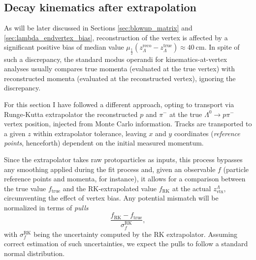 \subsection{Decay kinematics after extrapolation}
\label{sec:3:true_vtx_kinematics}
As will be later discussed in Sections \ref{sec:blowup_matrix} and \ref{sec:lambda_endvertex_bias}, reconstruction of the \lz vertex is affected by a significant positive bias of median value $\mu_\frac{1}{2} \left(z_\Lambda^\text{reco} - z_\Lambda^\text{true}\right) \approx \SI{40}{\centi\meter}$.
In spite of such a discrepancy, the standard modus operandi for kine\-matics-at-vertex analyses usually compares true momenta (evaluated at the true vertex) with reconstructed momenta (evaluated at the reconstructed vertex), ignoring the discrepancy.

For this section I have followed a different approach, opting to transport via Runge-Kutta extrapolator the reconstructed $p$ and $\pi^-$ at the true $\Lambda^0 \rightarrow p\pi^-$ vertex position, injected from Monte Carlo information.
Tracks are transported to a given $z$ within extrapolator tolerance, leaving $x$ and $y$ coordinates (\textit{reference points}, henceforth) dependent on the initial measured momentum.

Since the extrapolator takes raw protoparticles as inputs, this process bypasses any smoothing applied during the fit process and, given an observable $f$ (particle reference points and momenta, for instance), it allows for a comparison between the true value $f_\text{true}$ and the RK-extrapolated value $f_\text{RK}$ at the actual $z_\text{vtx}^\Lambda$, circumventing the effect of vertex bias.
Any potential mismatch will be normalized in terms of \textit{pulls}
\begin{equation}
	\frac{f_\text{RK} - f_\text{true}}{\sigma_f^\text{RK}},
\end{equation}
with $\sigma_f^\text{RK}$ being the uncertainty computed by the RK extrapolator.
Assuming correct estimation of such uncertainties, we expect the pulls to follow a standard normal distribution.

